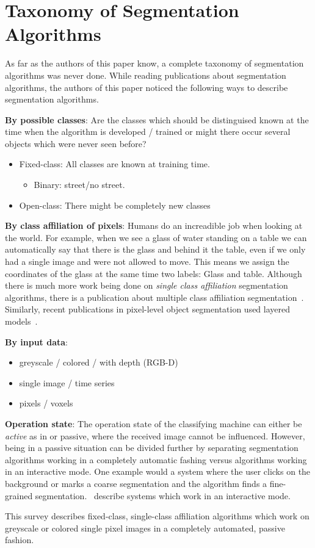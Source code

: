 \section{Taxonomy of Segmentation Algorithms}\label{sec:taxonomy}
As far as the authors of this paper know, a complete taxonomy of segmentation
algorithms was never done. While reading publications about segmentation
algorithms, the authors of this paper noticed the following ways to describe
segmentation algorithms.

\textbf{By possible classes}: Are the classes which should be distinguised
known at the time when the algorithm is developed / trained or might there
occur several objects which were never seen before?
\begin{itemize}
    \item Fixed-class: All classes are known at training time.
          \begin{itemize}
              \item Binary: street/no street.
          \end{itemize}
    \item Open-class: There might be completely new classes
\end{itemize}

\textbf{By class affiliation of pixels}: Humans do an increadible job when
looking at the world. For example, when we see a glass of water standing on a
table we can automatically say that there is the glass and behind it the table,
even if we only had a single image and were not allowed to move. This means we
assign the coordinates of the glass at the same time two labels: Glass and
table. Although there is much more work being done on \textit{single class
affiliation} segmentation algorithms, there is a publication about multiple
class affiliation segmentation~\cite{levin2008spectral}. Similarly, recent
publications in pixel-level object segmentation used layered
models~\cite{yang2012layered}.

\textbf{By input data}:
\begin{itemize}
    \item greyscale / colored / with depth (RGB-D)
    \item single image / time series
    \item pixels / voxels \cite{wolz2012multi}
\end{itemize}

\textbf{Operation state}: The operation state of the classifying machine can
either be \textit{active} as in
\cite{schiebener2011segmentation,schiebener2012discovery} or passive, where the
received image cannot be influenced. However, being in a passive situation can
be divided further by separating segmentation algorithms working in a
completely automatic fashing versus algorithms working in an interactive mode.
One example would a system where the user clicks on the background or marks a
coarse segmentation and the algorithm finds a fine-grained segmentation.
\cite{rother2004grabcut,protiere2007interactive}~describe systems which work
in an interactive mode.

This survey describes fixed-class, single-class affiliation algorithms which
work on greyscale or colored single pixel images in a completely automated,
passive fashion.
